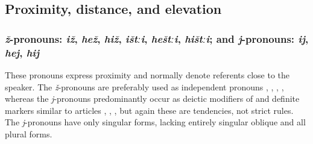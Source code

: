 \subsection{Proximity, distance, and elevation}
\label{ssec:Proximity, distance, cardinal directions, and height The six horizontal series}



\subsubsection{\textit{ž}-pronouns: \textit{iž}, \textit{hež}, \textit{hiž}, \textit{ištːi}, \textit{heštːi}, \textit{hištːi}; and \textit{j}-pronouns: \textit{ij}, \textit{hej}, \textit{hij}}
\label{sssec:z-pronouns j-pronouns}

These pronouns express proximity and normally denote referents close to the speaker. The \textit{ž}-pronouns are preferably used as independent pronouns , , , , whereas the \textit{j}-pronouns predominantly occur as deictic modifiers of  and definite markers similar to articles , , , but again these are tendencies, not strict rules. The \textit{j}-pronouns have only singular  forms, lacking entirely singular oblique and all plural forms.

